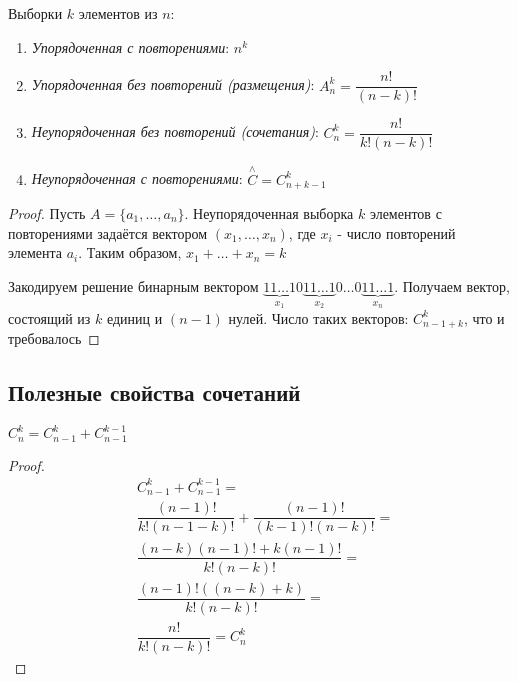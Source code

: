 \documentclass[a4paper, 14pt]{article}
\begin{document}
    \begin{definition}
        Выборки $k$ элементов из $n$:
        \begin{enumerate}
            \item {\it Упорядоченная с повторениями}: $n^k$
            \item {\it Упорядоченная без повторений (размещения)}: $A^k_n = \dfrac{n!}{(n-k)!}$
            \item {\it Неупорядоченная без повторений (сочетания)}: $C^k_n = \dfrac{n!}{k!(n-k)!}$
            \item {\it Неупорядоченная с повторениями}: $\stackrel{{\wedge}}{C} = C^k_{n+k-1}$
        \end{enumerate} 
        \begin{proof}
            Пусть $A = \{a_1, \dots, a_n\}$. Неупорядоченная выборка $k$ элементов
            с повторениями задаётся вектором $(x_1, \dots, x_n)$, где $x_i$ - число повторений
            элемента $a_i$. Таким образом, $x_1 + \dots + x_n = k$

            Закодируем решение бинарным вектором $\underbrace{11 \dots 1}_{x_1} 0 \underbrace{11 \dots 1}_{x_2} 0 \dots 0\underbrace{11 \dots 1}_{x_n}$.
            Получаем вектор, состоящий из $k$ единиц и $(n-1)$ нулей. Число таких векторов: $C^k_{n-1+k}$, что и требовалось
        \end{proof}
    \end{definition}

    \subsection*{Полезные свойства сочетаний}

    \begin{theorem}
        $C^k_n = C^k_{n-1} + C^{k-1}_{n-1}$
    \end{theorem}
    \begin{proof}
        \begin{align*}
            &C^k_{n-1} + C^{k-1}_{n-1} = \\
            &\dfrac{(n-1)!}{k!(n-1-k)!} + \dfrac{(n-1)!}{(k-1)!(n-k)!} = \\
            &\dfrac{(n-k)(n-1)! + k(n-1)!}{k!(n-k)!} = \\
            &\dfrac{(n-1)!((n-k) + k)}{k!(n-k)!} = \\
            &\dfrac{n!}{k!(n-k)!} = C^k_n
        \end{align*}
    \end{proof}
\end{document}
